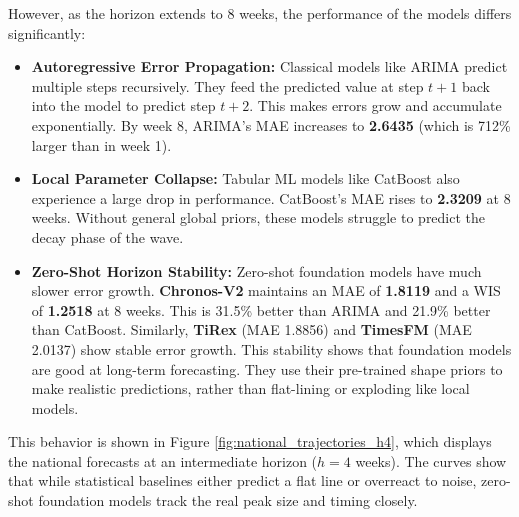However, as the horizon extends to 8 weeks, the performance of the models differs significantly:
\begin{itemize}
    \item \textbf{Autoregressive Error Propagation:} Classical models like ARIMA predict multiple steps recursively. They feed the predicted value at step $t+1$ back into the model to predict step $t+2$. This makes errors grow and accumulate exponentially. By week 8, ARIMA's MAE increases to \textbf{2.6435} (which is 712\% larger than in week 1).
    \item \textbf{Local Parameter Collapse:} Tabular ML models like CatBoost also experience a large drop in performance. CatBoost's MAE rises to \textbf{2.3209} at 8 weeks. Without general global priors, these models struggle to predict the decay phase of the wave.
    \item \textbf{Zero-Shot Horizon Stability:} Zero-shot foundation models have much slower error growth. \textbf{Chronos-V2} maintains an MAE of \textbf{1.8119} and a WIS of \textbf{1.2518} at 8 weeks. This is 31.5\% better than ARIMA and 21.9\% better than CatBoost. Similarly, \textbf{TiRex} (MAE 1.8856) and \textbf{TimesFM} (MAE 2.0137) show stable error growth. This stability shows that foundation models are good at long-term forecasting. They use their pre-trained shape priors to make realistic predictions, rather than flat-lining or exploding like local models.
\end{itemize}

This behavior is shown in Figure \ref{fig:national_trajectories_h4}, which displays the national forecasts at an intermediate horizon ($h=4$ weeks). The curves show that while statistical baselines either predict a flat line or overreact to noise, zero-shot foundation models track the real peak size and timing closely.

